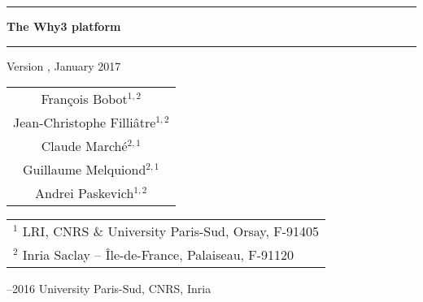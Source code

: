 \documentclass[a4paper,11pt,twoside,openright]{memoir}
\begin{document}
\sloppy

\thispagestyle{empty}

\begin{center}

\rule\textwidth{0.8mm}

\vfill

{
\fontsize{40}{40pt}\selectfont
\bfseries\sffamily The Why3 platform}

\vfill

\rule\textwidth{0.8mm}

\vfill


\begin{LARGE}
  Version \whyversion{}, January 2017
\end{LARGE}

\vfill

\begin{Large}
  \begin{tabular}{c}
  Fran\c{c}ois Bobot$^{1,2}$ \\
  Jean-Christophe Filli\^atre$^{1,2}$  \\
  Claude March\'e$^{2,1}$ \\
  Guillaume Melquiond$^{2,1}$\\
  Andrei Paskevich$^{1,2}$
\end{tabular}
\end{Large}
\vfill

\begin{flushleft}

\begin{tabular}{l}
$^1$ LRI, CNRS \& University Paris-Sud, Orsay, F-91405 \\
$^2$ Inria Saclay -- \^Ile-de-France, Palaiseau, F-91120
\end{tabular}

\bigskip

--2016 University Paris-Sud, CNRS, Inria



\end{flushleft}
\end{center}
\end{document}
